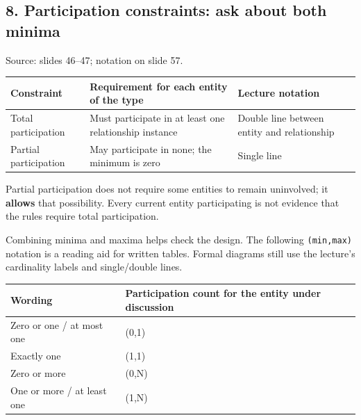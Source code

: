 \subsection{8. Participation constraints: ask about both minima}\label{02_er_modelling_en-participation-constraints-ask-about-both-minima}

Source: slides 46--47; notation on slide 57.

\begin{longtable}[]{@{}
  >{\raggedright\arraybackslash}p{}
  >{\raggedright\arraybackslash}p{}
  >{\raggedright\arraybackslash}p{}@{}}
\toprule\noalign{}
\begin{minipage}[b]{\linewidth}\raggedright
Constraint
\end{minipage} & \begin{minipage}[b]{\linewidth}\raggedright
Requirement for each entity of the type
\end{minipage} & \begin{minipage}[b]{\linewidth}\raggedright
Lecture notation
\end{minipage} \\
\midrule\noalign{}
\endhead
\bottomrule\noalign{}
\endlastfoot
Total participation & Must participate in at least one relationship instance & Double line between entity and relationship \\
Partial participation & May participate in none; the minimum is zero & Single line \\
\end{longtable}

Partial participation does not require some entities to remain uninvolved; it \textbf{allows} that possibility. Every current entity participating is not evidence that the rules require total participation.

Combining minima and maxima helps check the design. The following \texttt{(\allowbreak{}min,\allowbreak{}max)\allowbreak{}} notation is a reading aid for written tables. Formal diagrams still use the lecture's cardinality labels and single/double lines.

\begin{longtable}[]{@{}ll@{}}
\toprule\noalign{}
Wording & Participation count for the entity under discussion \\
\midrule\noalign{}
\endhead
\bottomrule\noalign{}
\endlastfoot
Zero or one / at most one & (0,1) \\
Exactly one & (1,1) \\
Zero or more & (0,N) \\
One or more / at least one & (1,N) \\
\end{longtable}

